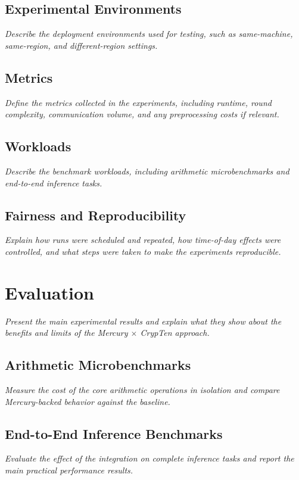 \subsection{Experimental Environments}
\textit{Describe the deployment environments used for testing, such as same-machine, same-region, and different-region settings.}

\subsection{Metrics}
\textit{Define the metrics collected in the experiments, including runtime, round complexity, communication volume, and any preprocessing costs if relevant.}

\subsection{Workloads}
\textit{Describe the benchmark workloads, including arithmetic microbenchmarks and end-to-end inference tasks.}

\subsection{Fairness and Reproducibility}
\textit{Explain how runs were scheduled and repeated, how time-of-day effects were controlled, and what steps were taken to make the experiments reproducible.}

\section{Evaluation}
\textit{Present the main experimental results and explain what they show about the benefits and limits of the Mercury $\times$ CrypTen approach.}

\subsection{Arithmetic Microbenchmarks}
\textit{Measure the cost of the core arithmetic operations in isolation and compare Mercury-backed behavior against the baseline.}

\subsection{End-to-End Inference Benchmarks}
\textit{Evaluate the effect of the integration on complete inference tasks and report the main practical performance results.}


